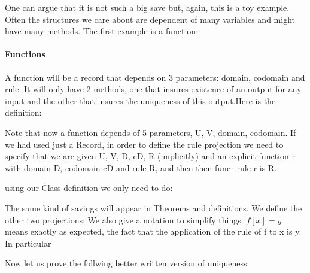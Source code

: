 One can argue that it is not such a big save but, again, this is a toy example. Often the structures we care about are dependent of many variables and might have many methods. The first example is a function:

     
\paragraph{\bf Functions}

 A function will be a record that depends on 3 parameters: domain, codomain and rule. It will only have 2 methods, one that insures existence of an output for any input and the other that insures the uniqueness of this output.Here is the definition:


Note that now a function depends of 5 parameters, U, V, domain, codomain. If we had used just a Record, in order to define the rule projection we need to specify that we are given U, V, D, cD, R (implicitly) and an explicit function r with domain D, codomain cD and rule R, and then then func\_rule r is R.


using our Class definition we only need to do:

The same kind of savings will appear in Theorems and definitions.
We define the other two projections:
We also give a notation to simplify things. $f[x]=y$ means exactly as expected, the fact that the application of the rule of f to x is y. In particular 

Now let us prove the follwing better written version of uniqueness:


